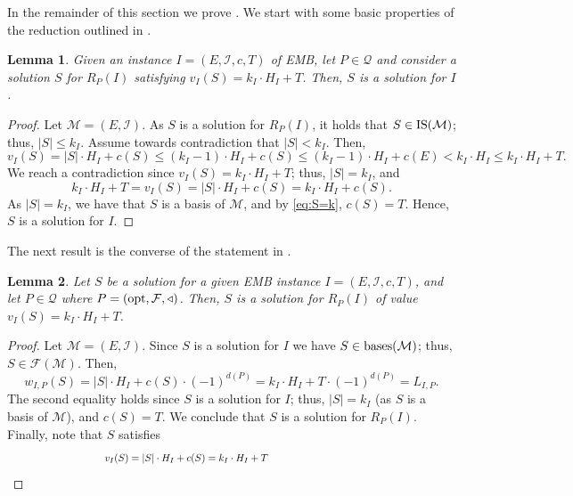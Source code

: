 \documentclass[11pt,letter]{article}
\newcommand{\opt}{\textnormal{opt}}
\newcommand{\bases}{\textnormal{bases}}
\newcommand{\IS}{\textnormal{IS}}
\newcommand{\cQ}{{\mathcal{Q}}}
\newcommand{\cI}{{\mathcal{I}}}
\newcommand{\cm}{{\mathcal{M}}}
\newcommand{\cF}{{\mathcal{F}}}
\newtheorem{lemma}{Lemma}[section]
\begin{document}
In the remainder of this section we prove . We start with some basic properties of the reduction outlined in .   

\begin{lemma}
\label{lem:FD2}
Given an instance $I =(E,\cI,c,T)$ of \textnormal{EMB},
let $P \in \cQ$ and consider a solution $S$ for $R_P(I)$ satisfying $v_I(S) = k_I \cdot H_I+T$. Then, $S$ is a solution for $I$.  
\end{lemma}

\begin{proof}
	Let $\cm = (E,\cI)$. As $S$ is a solution for $R_P(I)$, it holds that $S \in \IS(\cm)$; thus, $|S| \leq k_I$. Assume towards contradiction that $|S|<k_I$. Then, 
	$$v_I(S) = |S| \cdot H_I+c(S) \leq (k_I-1) \cdot H_I+c(S) \leq (k_I-1) \cdot H_I+c(E)<k_I \cdot H_I \leq k_I \cdot H_I+T.$$ 
	We reach a contradiction since $v_I(S) = k_I \cdot H_I+T$; thus, $|S| = k_I$, and  
	\begin{equation}
		\label{eq:S=k}
		k_I \cdot H_I+T = v_I(S) =   |S| \cdot H_I+c(S) =  k_I \cdot H_I+c(S). 
	\end{equation}  As $|S| = k_I$, we have that $S$ is a basis of $\cm$, and by \eqref{eq:S=k}, $c(S) = T$. Hence, $S$ is a solution for $I$.   
\end{proof}

The next result is the converse of the statement in .   

	\begin{lemma}
	\label{lem:FD1}
	Let $S$ be a solution for a given \textnormal{EMB} instance $I =(E,\cI,c,T)$,
	and let $P \in \cQ$ where $P = (\opt,\cF,\triangleleft)$. Then, $S$ is a solution for $R_P(I)$ of value $v_I(S) = k_I \cdot H_I+T$.  %
\end{lemma}

\begin{proof}
	Let $\cm = (E,\cI)$. Since $S$ is a solution for $I$ we have $S \in \bases(\cm)$; thus, $S \in \cF(\cm)$. Then,    
	$$w_{I,P}(S) = |S| \cdot H_I+c(S) \cdot (-1)^{d(P)} =  k_I \cdot H_I+T \cdot (-1)^{d(P)} = L_{I,P}.$$
	The second equality holds since $S$ is a solution for $I$; thus, $|S| = k_I$ (as $S$ is a basis of $\cm$), and $c(S) = T$. We conclude that $S$ is a solution for $R_P(I)$. Finally, note that $S$ satisfies 
\begin{align*}
~~~~~~~~~~~~~~~~~~~~~~~~~~~~~	v_I(S) = |S| \cdot H_I + c(S)
	= k_I \cdot H_I +T ~~~~~~~~~~~~~~~~~~~~~~~~~~~~~~~~~~~~~~~~~~~~~~~~~~~~~~~~ \qedhere
\end{align*}
\end{proof}
\end{document}
